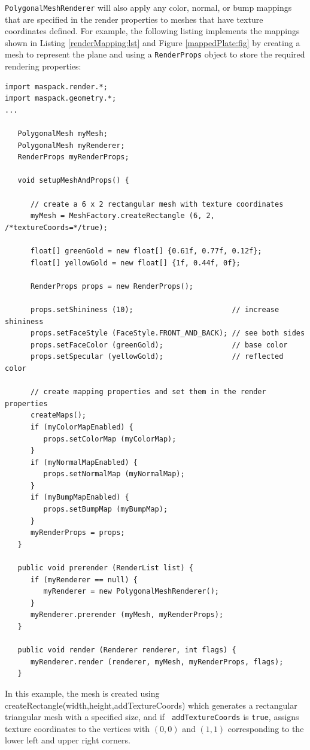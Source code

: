 {\tt PolygonalMeshRenderer} will also apply any color, normal, or
bump mappings that are specified in the render properties to meshes
that have texture coordinates defined. For example, the following
listing implements the mappings shown in Listing
\ref{renderMapping:lst} and Figure \ref{mappedPlate:fig} by creating a
mesh to represent the plane and using a {\tt RenderProps} object to
store the required rendering properties:
%
\begin{lstlisting}[]
import maspack.render.*;
import maspack.geometry.*;
...

   PolygonalMesh myMesh;
   PolygonalMesh myRenderer;
   RenderProps myRenderProps;

   void setupMeshAndProps() {

      // create a 6 x 2 rectangular mesh with texture coordinates
      myMesh = MeshFactory.createRectangle (6, 2, /*textureCoords=*/true);

      float[] greenGold = new float[] {0.61f, 0.77f, 0.12f};
      float[] yellowGold = new float[] {1f, 0.44f, 0f};

      RenderProps props = new RenderProps();

      props.setShininess (10);                       // increase shininess
      props.setFaceStyle (FaceStyle.FRONT_AND_BACK); // see both sides
      props.setFaceColor (greenGold);                // base color
      props.setSpecular (yellowGold);                // reflected color

      // create mapping properties and set them in the render properties
      createMaps();
      if (myColorMapEnabled) {
         props.setColorMap (myColorMap);
      }
      if (myNormalMapEnabled) {
         props.setNormalMap (myNormalMap);
      }
      if (myBumpMapEnabled) {
         props.setBumpMap (myBumpMap);
      }
      myRenderProps = props;
   }

   public void prerender (RenderList list) {
      if (myRenderer == null) {
         myRenderer = new PolygonalMeshRenderer();
      }
      myRenderer.prerender (myMesh, myRenderProps);
   }

   public void render (Renderer renderer, int flags) {
      myRenderer.render (renderer, myMesh, myRenderProps, flags);
   }
\end{lstlisting}
%
In this example, the mesh is created using %
{createRectangle(width,height,addTextureCoords)} which generates a
rectangular triangular mesh with a specified size, and if {\tt
addTextureCoords} is {\tt true}, assigns texture coordinates to the
vertices with $(0,0)$ and $(1,1)$ corresponding to the lower left and
upper right corners.

